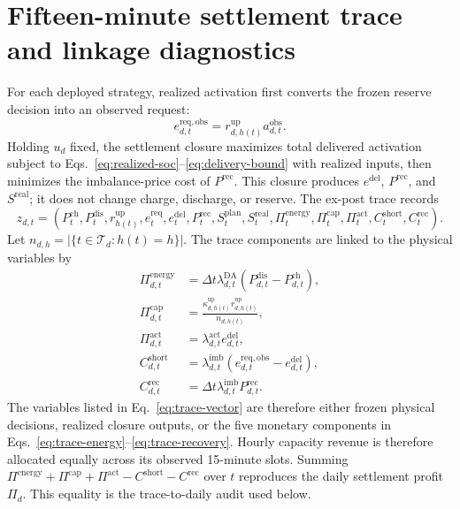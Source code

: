 \documentclass[11pt,a4paper]{article}
\begin{document}
\section{Fifteen-minute settlement trace and linkage diagnostics}

For each deployed strategy, realized activation first converts the frozen
reserve decision into an observed request:
\begin{equation}
  e^{\mathrm{req,obs}}_{d,t}
  =r^{\mathrm{up}}_{d,h(t)}a^{\mathrm{obs}}_{d,t}.
  \label{eq:realized-required-activation}
\end{equation}
Holding $u_d$ fixed, the settlement closure maximizes total delivered
activation subject to Eqs.~\eqref{eq:realized-soc}--\eqref{eq:delivery-bound}
with realized inputs, then minimizes the imbalance-price cost of
$P^{\mathrm{rec}}$.  This closure produces
$e^{\mathrm{del}}$, $P^{\mathrm{rec}}$, and $S^{\mathrm{real}}$; it does not
change charge, discharge, or reserve.  The ex-post trace records
\begin{equation}
  z_{d,t}=\left(
  P^{\mathrm{ch}}_t,P^{\mathrm{dis}}_t,r^{\mathrm{up}}_{h(t)},
  e^{\mathrm{req}}_t,e^{\mathrm{del}}_t,
  P^{\mathrm{rec}}_t,S^{\mathrm{plan}}_t,S^{\mathrm{real}}_t,
  \Pi^{\mathrm{energy}}_t,\Pi^{\mathrm{cap}}_t,
  \Pi^{\mathrm{act}}_t,C^{\mathrm{short}}_t,C^{\mathrm{rec}}_t
  \right).
  \label{eq:trace-vector}
\end{equation}
Let $n_{d,h}=|\{t\in\mathcal T_d:h(t)=h\}|$.  The trace components are linked
to the physical variables by
\begin{align}
  \Pi^{\mathrm{energy}}_{d,t}
  &=\Delta t\lambda^{\mathrm{DA}}_{d,t}
  \left(P^{\mathrm{dis}}_{d,t}-P^{\mathrm{ch}}_{d,t}\right),
  \label{eq:trace-energy}\\
  \Pi^{\mathrm{cap}}_{d,t}
  &=\frac{\kappa^{\mathrm{up}}_{d,h(t)}r^{\mathrm{up}}_{d,h(t)}}
  {n_{d,h(t)}},
  \label{eq:trace-capacity}\\
  \Pi^{\mathrm{act}}_{d,t}
  &=\lambda^{\mathrm{act}}_{d,t}e^{\mathrm{del}}_{d,t},
  \label{eq:trace-activation}\\
  C^{\mathrm{short}}_{d,t}
  &=\lambda^{\mathrm{imb}}_{d,t}
  \left(e^{\mathrm{req,obs}}_{d,t}-e^{\mathrm{del}}_{d,t}\right),
  \label{eq:trace-shortfall}\\
  C^{\mathrm{rec}}_{d,t}
  &=\Delta t\lambda^{\mathrm{imb}}_{d,t}P^{\mathrm{rec}}_{d,t}.
  \label{eq:trace-recovery}
\end{align}
The variables listed in Eq.~\eqref{eq:trace-vector} are therefore either
frozen physical decisions, realized closure outputs, or the five monetary
components in Eqs.~\eqref{eq:trace-energy}--\eqref{eq:trace-recovery}.
Hourly capacity revenue is therefore allocated equally across its observed
15-minute slots.  Summing
$\Pi^{\mathrm{energy}}+\Pi^{\mathrm{cap}}+\Pi^{\mathrm{act}}
-C^{\mathrm{short}}-C^{\mathrm{rec}}$ over $t$ reproduces the daily settlement
profit $\Pi_d$.  This equality is the trace-to-daily audit used below.
\end{document}
